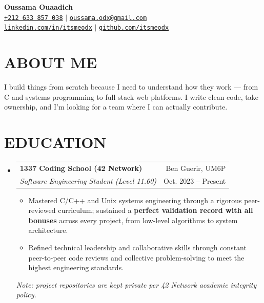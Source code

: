 \documentclass[letterpaper,11pt]{article}
\makeatletter
\newcommand{\entry}[1]{
  \item\small{
    {#1 \vspace{-1pt}}
  }
}
\newcommand{\sectionHeader}[4]{
  \vspace{-1pt}\item
    \begin{tabular*}{\textwidth}[t]{l@{\extracolsep{\fill}}r}
      \textbf{#1} & {\color{dark-grey}\small #2}\vspace{1pt}\\ %
      \textit{#3} & {\color{dark-grey} \small #4}\\ %
    \end{tabular*}\vspace{-4pt}
}
\newcommand{\sectionNote}[1]{{\color{dark-grey}\small\textit{#1}}}
\newcommand{\sectionListStart}{\begin{itemize}[leftmargin=0in, label={}]}
\newcommand{\sectionListEnd}{\end{itemize}}
\newcommand{\itemListStart}{\begin{itemize}}
\newcommand{\itemListEnd}{\end{itemize}\vspace{0pt}}
\makeatother
\begin{document}
\begin{center}
  \textbf{\Huge Oussama Ouaadich} \\ \vspace{5pt}
  \small \faPhone* \href{tel:+212633857038}{\texttt{+212 633 857 038}} \hspace{1pt} $|$
  \hspace{1pt} \faEnvelope \hspace{2pt} \href{mailto:oussama.odx@gmail.com}{\texttt{oussama.odx@gmail.com}} \\[3pt]
  \small \href{https://linkedin.com/in/itsmeodx}{\faLinkedin \hspace{2pt} \texttt{linkedin.com/in/itsmeodx}} \hspace{1pt} $|$
  \hspace{1pt} \href{https://github.com/itsmeodx}{\faGithub \hspace{2pt} \texttt{github.com/itsmeodx}}
  \\ \vspace{-3pt}
\end{center}

\section{ABOUT ME}
\begin{itemize}[leftmargin=0in, label={}]
  \small{\item{
        I build things from scratch because I need to understand how they work --- from C and systems programming to full-stack web platforms. I write clean code, take ownership, and I'm looking for a team where I can actually contribute.
        }}
\end{itemize}


\section{EDUCATION}
\sectionListStart
\sectionHeader
{1337 Coding School (42 Network)}{Ben Guerir, UM6P}
{Software Engineering Student (Level 11.60)}{Oct. 2023 -- Present}
\itemListStart
\entry{Mastered C/C++ and Unix systems engineering through a rigorous peer-reviewed curriculum; sustained a \textbf{perfect validation record with all bonuses} across every project, from low-level algorithms to system architecture.}
\entry{Refined technical leadership and collaborative skills through constant peer-to-peer code reviews and collective problem-solving to meet the highest engineering standards.}
\itemListEnd
\sectionNote{Note: project repositories are kept private per 42 Network academic integrity policy.}
\sectionListEnd
\end{document}
